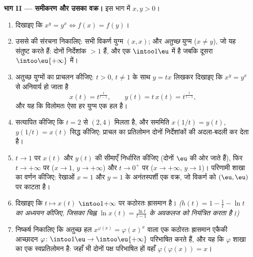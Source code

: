 \begin{problem}
\medskip \noindent\textbf{भाग II --- समीकरण और उसका वक्र।} इस भाग में $x, y
> 0$।
\begin{enumerate}[resume]
  \item दिखाइए कि $x^y = y^x \iff f(x) = f(y)$।
  \item उससे  की संरचना निकालिए: सभी विकर्ण युग्म $(x, x)$; और
  \emph{अतुच्छ} युग्म ($x \neq y$), जो यह संतुष्ट करते हैं: दोनों निर्देशांक
  $> 1$ हैं, और एक $\intoo1\eu$ में है जबकि दूसरा $\intoo\eu{+\infty}$ में।
  \item अतुच्छ युग्मों का प्राचलन कीजिए: $t > 0$, $t \neq 1$ के साथ $y = tx$
  लिखकर दिखाइए कि $x^y = y^x$ से अनिवार्य हो जाता है
        \[
        x(t) = t^{\frac1{t-1}},
        \qquad
        y(t) = t\,x(t) = t^{\frac{t}{t-1}},
        \]
        और यह कि विलोमतः ऐसा हर युग्म एक हल है।
  \item सत्यापित कीजिए कि $t = 2$ से $(2, 4)$ मिलता है, और सममिति $x(1/t) =
  y(t)$, $y(1/t) = x(t)$ सिद्ध कीजिए: प्राचल का प्रतिलोमन दोनों निर्देशांकों
  की अदला-बदली कर देता है।
  \item $t \to 1$ पर $x(t)$ और $y(t)$ की सीमाएँ निर्धारित कीजिए (दोनों $\eu$
  की ओर जाते हैं), फिर $t \to +\infty$ पर ($x \to 1$, $y \to +\infty$) और $t
  \to 0^+$ पर ($x \to +\infty$, $y \to 1$)। परिणामी शाखा का वर्णन कीजिए:
  रेखाओं $x = 1$ और $y = 1$ के अनंतस्पर्शी एक वक्र, जो विकर्ण को $(\eu,
  \eu)$ पर काटता है।
  \item दिखाइए कि $t \mapsto x(t)$ $\intoo1{+\infty}$ पर कठोरतः ह्रासमान है।
  \emph{($h(t) = 1 - \frac1t - \ln t$ का अध्ययन कीजिए, जिसका चिह्न $\ln x(t)
  = \frac{\ln t}{t - 1}$ के अवकलज को नियंत्रित करता है।)}
  \item निष्कर्ष निकालिए कि अतुच्छ हल $x^{\varphi(x)} = \varphi(x)^x$ वाला
  एक कठोरतः ह्रासमान एकैकी आच्छादन $\varphi \colon \intoo1\eu \to
  \intoo\eu{+\infty}$ परिभाषित करते हैं, और यह कि $\varphi$ शाखा का एक
  स्वप्रतिलोमन है: जहाँ भी दोनों पक्ष परिभाषित हों वहाँ $\varphi(\varphi(x))
  = x$।
\end{enumerate}


\end{problem}
